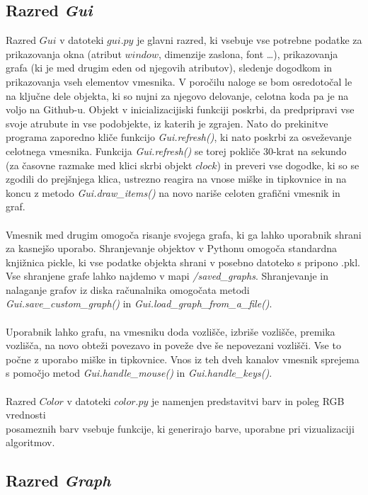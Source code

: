 \documentclass[11pt]{article}
\begin{document}
\subsection{Razred \textit{Gui}}

Razred $Gui$ v datoteki $gui.py$ je glavni razred, ki vsebuje vse potrebne podatke za prikazovanja okna (atribut $window$, dimenzije zaslona, font \dots), prikazovanja grafa (ki je med drugim eden od njegovih atributov), sledenje dogodkom in prikazovanja vseh elementov vmesnika. V poročilu naloge se bom osredotočal le na ključne dele objekta, ki so nujni za njegovo delovanje, celotna koda pa je na voljo na Github-u. Objekt v inicializacijiski funkciji poskrbi, da predpripravi vse svoje atrubute in vse podobjekte, iz katerih je zgrajen. Nato do prekinitve programa zaporedno kliče funkcijo \textit{Gui.refresh()}, ki nato poskrbi za osveževanje celotnega vmesnika. Funkcija \textit{Gui.refresh()} se torej pokliče 30-krat na sekundo (za časovne razmake med klici skrbi objekt $clock$) in preveri vse dogodke, ki so se zgodili do prejšnjega klica, ustrezno reagira na vnose miške in tipkovnice in na koncu z metodo \textit{Gui.draw\_items()} na novo nariše celoten grafični vmesnik in graf.
\\ \\
Vmesnik med drugim omogoča risanje svojega grafa, ki ga lahko uporabnik shrani za kasnejšo uporabo. Shranjevanje objektov v Pythonu omogoča standardna knjižnica pickle, ki vse podatke objekta shrani v posebno datoteko s pripono .pkl. Vse shranjene grafe lahko najdemo v mapi \textit{/saved\_graphs}. Shranjevanje in nalaganje grafov iz diska računalnika omogočata metodi \textit{Gui.save\_custom\_graph()} in \textit{Gui.load\_graph\_from\_a\_file()}.
\\ \\
Uporabnik lahko grafu, na vmesniku doda vozlišče, izbriše vozlišče, premika vozlišča, na novo obteži povezavo in poveže dve še nepovezani vozlišči. Vse to počne z uporabo miške in tipkovnice. Vnos iz teh dveh kanalov vmesnik sprejema s pomočjo metod \textit{Gui.handle\_mouse()} in \textit{Gui.handle\_keys()}.
\\ \\
Razred $Color$ v datoteki $color.py$ je namenjen predstavitvi barv in poleg RGB vrednosti \\ posameznih barv vsebuje funkcije, ki generirajo barve, uporabne pri vizualizaciji algoritmov.

\subsection{Razred \textit{Graph}}
\end{document}
